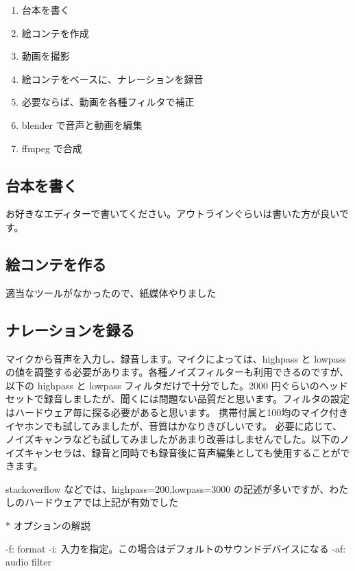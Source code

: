 \documentclass[mingoth,a4paper]{jsarticle}
\begin{document}
\begin{enumerate}
\item{台本を書く}
\item{絵コンテを作成}
\item{動画を撮影}
\item{絵コンテをベースに、ナレーションを録音}
\item{必要ならば、動画を各種フィルタで補正}
\item{blender で音声と動画を編集}
\item{ffmpeg で合成}
\end{enumerate}

\subsection{台本を書く}
お好きなエディターで書いてください。アウトラインぐらいは書いた方が良いです。

\subsection{絵コンテを作る}
適当なツールがなかったので、紙媒体やりました

\subsection{ナレーションを録る}
マイクから音声を入力し、録音します。マイクによっては、highpass と lowpass の値を調整する必要があります。各種ノイズフィルターも利用できるのですが、以下の highpass と lowpass フィルタだけで十分でした。2000 円ぐらいのヘッドセットで録音しましたが、聞くには問題ない品質だと思います。フィルタの設定はハードウェア毎に探る必要があると思います。
携帯付属と100均のマイク付きイヤホンでも試してみましたが、音質はかなりきびしいです。
必要に応じて、ノイズキャンラなども試してみましたがあまり改善はしませんでした。以下のノイズキャンセラは、録音と同時でも録音後に音声編集としても使用することができます。

stackoverflow などでは、highpass=200,lowpass=3000 の記述が多いですが、わたしのハードウェアでは上記が有効でした

* オプションの解説
\begin{commandline}
  -f: format
  -i: 入力を指定。この場合はデフォルトのサウンドデバイスになる
  -af: audio filter
\end{commandline}
\end{document}
